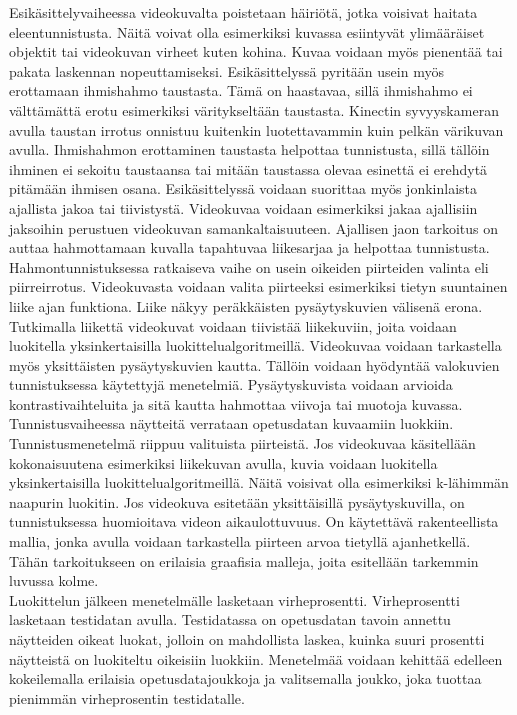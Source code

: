 Esikäsittelyvaiheessa videokuvalta poistetaan häiriötä, jotka voisivat haitata eleentunnistusta.
Näitä voivat olla esimerkiksi kuvassa esiintyvät ylimääräiset objektit tai videokuvan virheet kuten kohina.
Kuvaa voidaan myös pienentää tai pakata laskennan nopeuttamiseksi. Esikäsittelyssä pyritään usein myös erottamaan ihmishahmo taustasta. Tämä on haastavaa, sillä
ihmishahmo ei välttämättä erotu esimerkiksi väritykseltään taustasta. Kinectin syvyyskameran avulla taustan irrotus onnistuu kuitenkin luotettavammin kuin pelkän 
värikuvan avulla. Ihmishahmon erottaminen taustasta helpottaa tunnistusta, sillä tällöin ihminen ei sekoitu taustaansa tai mitään taustassa olevaa
esinettä ei erehdytä pitämään ihmisen osana. Esikäsittelyssä voidaan suorittaa myös jonkinlaista ajallista jakoa tai tiivistystä. Videokuvaa
voidaan esimerkiksi jakaa ajallisiin jaksoihin perustuen videokuvan samankaltaisuuteen. Ajallisen jaon 
tarkoitus on auttaa hahmottamaan kuvalla tapahtuvaa liikesarjaa ja helpottaa tunnistusta.\citep{6239178} \\

Hahmontunnistuksessa ratkaiseva vaihe on usein oikeiden piirteiden valinta eli piirreirrotus. Videokuvasta voidaan valita piirteeksi esimerkiksi 
tietyn suuntainen liike ajan funktiona. Liike näkyy peräkkäisten pysäytyskuvien välisenä erona. Tutkimalla liikettä
videokuvat voidaan tiivistää liikekuviin, joita voidaan luokitella yksinkertaisilla luokittelualgoritmeillä. 
Videokuvaa voidaan tarkastella myös yksittäisten pysäytyskuvien kautta. 
Tällöin voidaan hyödyntää valokuvien tunnistuksessa käytettyjä menetelmiä.
Pysäytyskuvista voidaan arvioida kontrastivaihteluita ja sitä kautta hahmottaa viivoja tai muotoja kuvassa. \citep{6239178}  \\

Tunnistusvaiheessa näytteitä verrataan opetusdatan kuvaamiin luokkiin. Tunnistusmenetelmä riippuu valituista piirteistä.
Jos videokuvaa käsitellään kokonaisuutena esimerkiksi liikekuvan avulla, kuvia voidaan luokitella yksinkertaisilla luokittelualgoritmeillä. 
Näitä voisivat olla esimerkiksi k-lähimmän naapurin luokitin. Jos videokuva esitetään yksittäisillä pysäytyskuvilla, 
on tunnistuksessa huomioitava videon aikaulottuvuus. On käytettävä rakenteellista mallia, jonka avulla voidaan tarkastella piirteen arvoa
tietyllä ajanhetkellä. Tähän tarkoitukseen on erilaisia graafisia malleja, joita esitellään tarkemmin luvussa kolme. \citep{6239178} \\

Luokittelun jälkeen menetelmälle lasketaan virheprosentti. Virheprosentti lasketaan testidatan avulla.
Testidatassa on opetusdatan tavoin annettu näytteiden oikeat luokat, jolloin on mahdollista laskea, kuinka suuri prosentti
näytteistä on luokiteltu oikeisiin luokkiin. Menetelmää voidaan kehittää edelleen kokeilemalla erilaisia
opetusdatajoukkoja ja valitsemalla joukko, joka tuottaa pienimmän virheprosentin testidatalle. \citep{6239178} 


